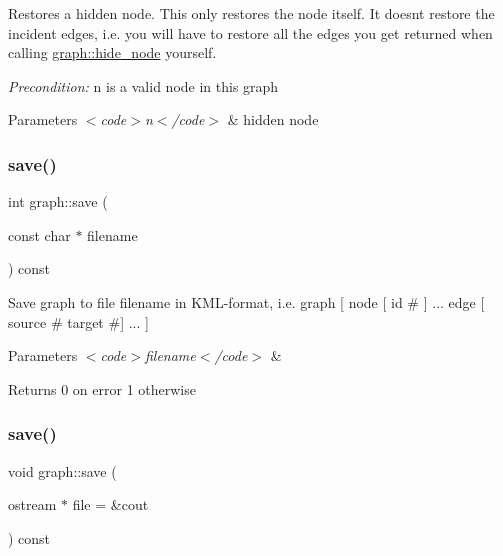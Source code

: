 Restores a hidden node. This only restores the node itself. It doesn\textquotesingle{}t restore the incident edges, i.\+e. you will have to restore all the edges you get returned when calling \mbox{\hyperlink{classgraph_a4f0177ffe8eaddd9c5bec73078bed873}{graph\+::hide\+\_\+node}} yourself. ~\newline
 

{\itshape Precondition\+:} {\ttfamily n} is a valid node in this graph 
\begin{DoxyParams}{Parameters}
{\em $<$code$>$n$<$/code$>$} & hidden node \\
\hline
\end{DoxyParams}
\mbox{\label{classgraph_a7bd0712a528249d1585085a64ac3e661}} 
\subsubsection{\texorpdfstring{save()}{save()}\hspace{0.1cm}{\footnotesize\ttfamily [1/2]}}
{\footnotesize\ttfamily int graph\+::save (\begin{DoxyParamCaption}\item[{const char $\ast$}]{filename }\end{DoxyParamCaption}) const}

Save graph to file {\ttfamily filename} in K\+M\+L-\/format, i.\+e. {\ttfamily graph \mbox{[} node \mbox{[} id \# \mbox{]} ... edge \mbox{[} source \# target \#\mbox{]} ... \mbox{]}}


\begin{DoxyParams}{Parameters}
{\em $<$code$>$filename$<$/code$>$} & \\
\hline
\end{DoxyParams}
\begin{DoxyReturn}{Returns}
0 on error 1 otherwise 
\end{DoxyReturn}
\mbox{\label{classgraph_a075a8a97c862b697c76682e35ceceb00}} 
\subsubsection{\texorpdfstring{save()}{save()}\hspace{0.1cm}{\footnotesize\ttfamily [2/2]}}
{\footnotesize\ttfamily void graph\+::save (\begin{DoxyParamCaption}\item[{ostream $\ast$}]{file = {\ttfamily \&cout} }\end{DoxyParamCaption}) const}


